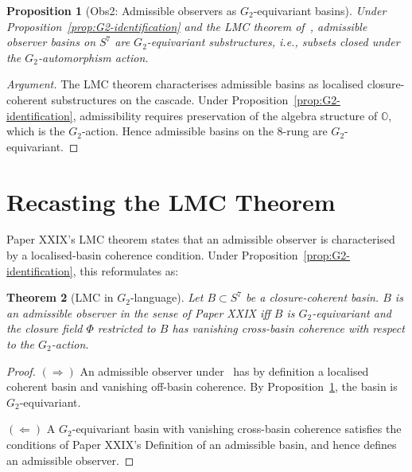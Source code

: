 \documentclass[12pt]{article}
\newtheorem{theorem}{Theorem}
\newtheorem{proposition}[theorem]{Proposition}
\theoremstyle{definition}
\theoremstyle{remark}
\newcommand{\Oo}{\mathbb{O}}
\newcommand{\Gtwo}{G_2}
\begin{document}
\begin{proposition}[Obs2: Admissible observers as $\Gtwo$-equivariant basins]\label{prop:admissible-basins}
Under Proposition~\ref{prop:G2-identification} and the LMC theorem of~\citep{SmartXXIX}, admissible observer basins on $S^7$ are $\Gtwo$-equivariant substructures, i.e., subsets closed under the $\Gtwo$-automorphism action.
\end{proposition}

\begin{proof}[Argument]
The LMC theorem characterises admissible basins as localised closure-coherent substructures on the cascade. Under Proposition~\ref{prop:G2-identification}, admissibility requires preservation of the algebra structure of $\Oo$, which is the $\Gtwo$-action. Hence admissible basins on the $8$-rung are $\Gtwo$-equivariant.
\end{proof}

\section{Recasting the LMC Theorem}\label{sec:LMC-recast}

Paper XXIX's LMC theorem states that an admissible observer is characterised by a localised-basin coherence condition. Under Proposition~\ref{prop:G2-identification}, this reformulates as:

\begin{theorem}[LMC in $\Gtwo$-language]\label{thm:LMC-G2}
Let $B \subset S^7$ be a closure-coherent basin. $B$ is an admissible observer in the sense of Paper XXIX iff $B$ is $\Gtwo$-equivariant and the closure field $\Phi$ restricted to $B$ has vanishing cross-basin coherence with respect to the $\Gtwo$-action.
\end{theorem}

\begin{proof}
$(\Rightarrow)$ An admissible observer under~\citep{SmartXXIX} has by definition a localised coherent basin and vanishing off-basin coherence. By Proposition~\ref{prop:admissible-basins}, the basin is $\Gtwo$-equivariant.

$(\Leftarrow)$ A $\Gtwo$-equivariant basin with vanishing cross-basin coherence satisfies the conditions of Paper XXIX's Definition of an admissible basin, and hence defines an admissible observer.
\end{proof}
\end{document}
